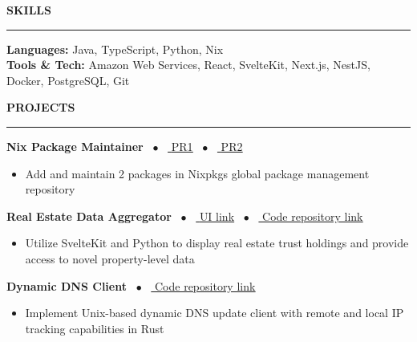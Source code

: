 \documentclass[10pt]{article}
\newcommand{\link}[2]{\href{#2}{\color{darkgray} \uline{#1}}}
\newcommand{\heading}[1]{{\Large \bfseries \color{primary} #1}}
\begin{document}
\vspace{12pt}

\heading{SKILLS}
\vspace{4pt}
\hrule
\vspace{6pt}

{\bfseries Languages:} Java, TypeScript, Python, Nix \\
{\bfseries Tools \& Tech:} Amazon Web Services, React, SvelteKit, Next.js, NestJS, Docker, PostgreSQL, Git

\vspace{12pt}

\heading{PROJECTS}
\vspace{4pt}
\hrule
\vspace{6pt}

{\bfseries Nix Package Maintainer} \ $\bullet$ \ \link{PR1}{https://github.com/NixOS/nixpkgs/pull/309387} \ $\bullet$ \ \link{PR2}{https://github.com/NixOS/nixpkgs/pull/326242}
\begin{itemize}
    \item Add and maintain 2 packages in Nixpkgs global package management repository
\end{itemize}
\vspace{6pt}
{\bfseries Real Estate Data Aggregator} \ $\bullet$ \ \link{UI link}{https://housefire.liammurphydev.com} \ $\bullet$ \ \link{Code repository link}{https://github.com/liam-murphy14/python_serverless_housefire}
\begin{itemize}
    \item Utilize SvelteKit and Python to display real estate trust holdings and provide access to novel property-level data
\end{itemize}
\vspace{6pt}
{\bfseries Dynamic DNS Client} \ $\bullet$ \ \link{Code repository link}{https://github.com/liam-murphy14/rusty_ddns}
\begin{itemize}
    \item Implement Unix-based dynamic DNS update client with remote and local IP tracking capabilities in Rust
\end{itemize}
\end{document}
